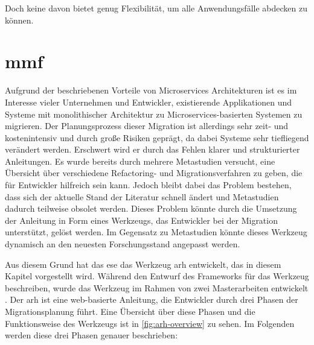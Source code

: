 Doch keine davon bietet genug Flexibilität, um alle Anwendungsfälle abdecken zu können.

\section{\acrfull{mmf}}
\label{sec:mmf}

Aufgrund der beschriebenen Vorteile von Microservices Architekturen ist es im Interesse vieler Unternehmen und Entwickler, existierende Applikationen und Systeme mit monolithischer Architektur zu Microservices-basierten Systemen zu migrieren.
Der Planungsprozess dieser Migration ist allerdings sehr zeit- und kostenintensiv und durch große Risiken geprägt, da dabei Systeme sehr tiefliegend verändert werden.
Erschwert wird er durch das Fehlen klarer und strukturierter Anleitungen.
Es wurde bereits durch mehrere Metastudien versucht, eine Übersicht über verschiedene Refactoring- und Migrationsverfahren zu geben, die für Entwickler hilfreich sein kann.
Jedoch bleibt dabei das Problem bestehen, dass sich der aktuelle Stand der Literatur schnell ändert und Metastudien dadurch teilweise obsolet werden.
Dieses Problem könnte durch die Umsetzung der Anleitung in Form eines Werkzeugs, das Entwickler bei der Migration unterstützt, gelöst werden.
Im Gegensatz zu Metastudien könnte dieses Werkzeug dynamisch an den neuesten Forschungsstand angepasst werden.

Aus diesem Grund hat das \gls{ese} das Werkzeug \gls{arh} \cite{arh-github} entwickelt, das in diesem Kapitel vorgestellt wird.
Während  den Entwurf des Frameworks für das Werkzeug beschreiben, wurde das Werkzeug im Rahmen von zwei Masterarbeiten entwickelt \cite{master-daniel-koch}\cite{master-tobias-haller}.
Der \gls{arh} ist eine web-basierte Anleitung, die Entwickler durch drei Phasen der Migrationsplanung führt.
Eine Übersicht über diese Phasen und die Funktionsweise des Werkzeugs ist in \cref{fig:arh-overview} zu sehen.
Im Folgenden werden diese drei Phasen genauer beschrieben:


